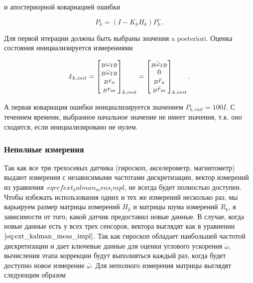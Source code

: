 \documentclass[12pt,a4paper]{article}
\begin{document}
и апостериорной ковариацией ошибки

\begin{equation}
\label{eq:ext_kalman_P_apost}
	P_k = (I - K_kH_k)P_k^- .
\end{equation}

Для первой итерации должны быть выбраны значения a posteriori. Оценка состояния инициализируется измерениями

\begin{equation*}
	\hat x_{k,init} = 
	\begin{bmatrix}
		{\vphantom \omega}_B \omega_{IB} \\
		{\vphantom \omega}_B \dot\omega_{IB} \\
		{\vphantom r}_B r_a \\
		{\vphantom r}_B r_m \\
	\end{bmatrix}_{k,init} =
	\begin{bmatrix}
		{\vphantom \omega}_B \bar\omega_{IB} \\
		0 \\
		{\vphantom r}_B \bar r_a \\
		{\vphantom r}_B \bar r_m \\
	\end{bmatrix}_{k,init} .
\end{equation*}

А первая ковариация ошибки инициализируется значением $P_{k,init}=100I$. С течением времени, выбранное начальное значение не имеет значения, т.к. оно сходится, если инициализировано не нулем.

\subsubsection{Неполные измерения}

Так как все три трехосевых датчика (гироскоп, акселерометр, магнитометр) выдают измерения с независимыми частотами дискретизации, вектор измерений из уравнения~$eqref{ext_kalman_meas_impl}$, не всегда будет полностью доступен. Чтобы избежать использования одних и тех же измерений несколько раз, мы варьируем размер матрицы измерений $H_k$ и матрицы шума измерений $R_k$, в зависимости от того, какой датчик предоставил новые данные. В случае, когда новые данные есть у всех трех сенсоров, вектора выглядят как в уравнении~$\eqref{eq:ext_kalman_meas_impl}$. Так как гироскоп обладает наибольшей частотой дискретизации и дает ключевые данные для оценки углового ускорения $\dot\omega$, вычисления этапа коррекции будут выполняться каждый раз, когда будет доступно новое измерение $\bar \omega$. Для неполного измерения матрицы выглядят следующим образом
\end{document}
